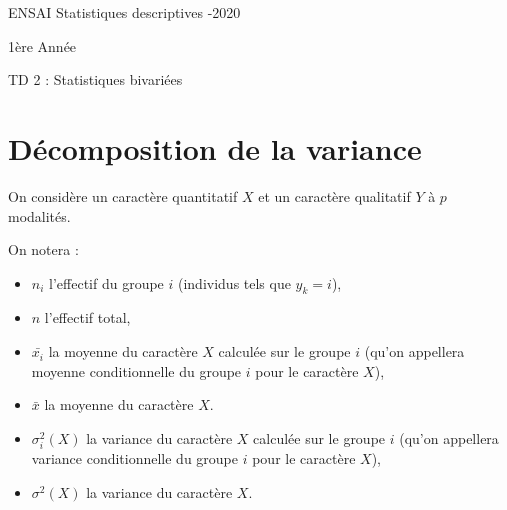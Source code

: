 \documentclass[a4paper,11pt]{article}
\begin{document}
ENSAI \qquad \qquad \qquad\qquad  \qquad Statistiques descriptives \qquad \qquad \qquad \qquad {}-2020

1\`{e}re Ann\'{e}e

\bigskip

\begin{center}
{\Large \medskip TD 2 : Statistiques bivariées}
\end{center}
\bigskip





\section{Décomposition de la variance}

\noindent On considère un caractère quantitatif $X$ et un caractère qualitatif $Y$ à $p$ modalités.

\noindent On notera :
\begin{itemize}
  \item $n_i$ l'effectif du groupe $i$ (individus tels que $y_k=i$),
  \item $n$ l'effectif total,
  \item $\bar{x_i}$ la moyenne du caractère $X$ calculée sur le groupe $i$ (qu'on appellera moyenne conditionnelle du groupe $i$ pour le caractère $X$),
  \item $\bar{x}$ la moyenne du caractère $X$.
  \item $\sigma_{i}^2(X)$ la variance du caractère $X$ calculée sur le groupe $i$ (qu'on appellera variance conditionnelle du groupe $i$ pour le caractère $X$),
  \item $\sigma^2(X)$ la variance du caractère $X$.
\end{itemize}
\end{document}
